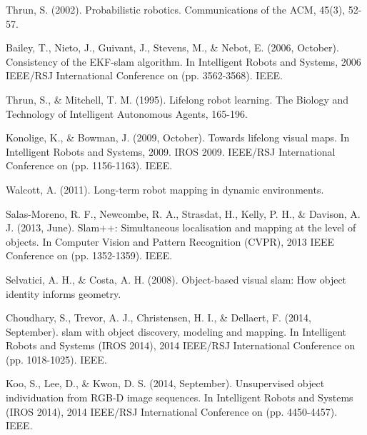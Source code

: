 \documentclass[]{article}
\begin{document}
    \begin{thebibliography}{99} %

            \newblock Thrun, S. (2002). Probabilistic robotics. Communications of the ACM, 45(3), 52-57.


         \newblock Bailey, T., Nieto, J., Guivant, J., Stevens, M., \& Nebot, E. (2006, October). Consistency of the EKF-slam algorithm. In Intelligent Robots and Systems, 2006 IEEE/RSJ International Conference on (pp. 3562-3568). IEEE.  

            \newblock Thrun, S., \& Mitchell, T. M. (1995). Lifelong robot learning. The Biology and Technology of Intelligent Autonomous Agents, 165-196.

            \newblock Konolige, K., \& Bowman, J. (2009, October). Towards lifelong visual maps. In Intelligent Robots and Systems, 2009. IROS 2009. IEEE/RSJ International Conference on (pp. 1156-1163). IEEE.

            \newblock Walcott, A. (2011). Long-term robot mapping in dynamic environments. 



            \newblock Salas-Moreno, R. F., Newcombe, R. A., Strasdat, H., Kelly, P. H., \& Davison, A. J. (2013, June). Slam++: Simultaneous localisation and mapping at the level of objects. In Computer Vision and Pattern Recognition (CVPR), 2013 IEEE Conference on (pp. 1352-1359). IEEE.

            \newblock Selvatici, A. H., \& Costa, A. H. (2008). Object-based visual slam: How object identity informs geometry.

            \newblock Choudhary, S., Trevor, A. J., Christensen, H. I., \& Dellaert, F. (2014, September). slam with object discovery, modeling and mapping. In Intelligent Robots and Systems (IROS 2014), 2014 IEEE/RSJ International Conference on (pp. 1018-1025). IEEE.

            \newblock Koo, S., Lee, D., \& Kwon, D. S. (2014, September). Unsupervised object individuation from RGB-D image sequences. In Intelligent Robots and Systems (IROS 2014), 2014 IEEE/RSJ International Conference on (pp. 4450-4457). IEEE.


\end{thebibliography}
\end{document}
